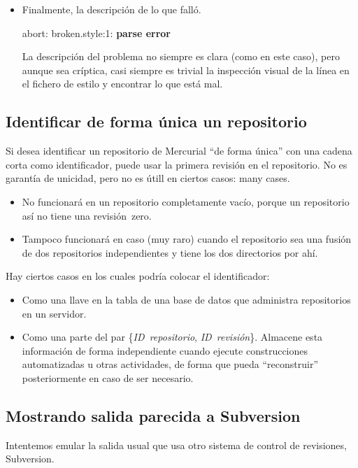 {{\begin{itemize}
\item Finalmente, la descripción de lo que falló.
  \begin{codesample4}
    abort: broken.style:1: \textbf{parse error}
  \end{codesample4}
  La descripción del problema no siempre es clara (como en este caso),
  pero aunque sea críptica, casi siempre es trivial la inspección
  visual de la línea en el fichero de estilo y encontrar lo que está
  mal.
\end{itemize}

\subsection{Identificar de forma única un repositorio}

Si desea identificar un repositorio de Mercurial ``de forma única''
con una cadena corta como identificador, puede usar la primera
revisión en el repositorio.
No es garantía de unicidad, pero no es útill en ciertos casos:
many cases.
\begin{itemize}
\item No funcionará en un repositorio completamente vacío, porque un
  repositorio así no tiene una revisión~zero.
\item Tampoco funcionará en caso (muy raro) cuando el repositorio sea
  una fusión de dos repositorios independientes y tiene los dos
  directorios por ahí.
\end{itemize}
Hay ciertos casos en los cuales podría colocar el identificador:
\begin{itemize}
\item Como una llave en la tabla de una base de datos que administra
  repositorios en un servidor.
\item Como una parte del par \{\emph{ID~repositorio}, \emph{ID~revisión}\}.
  Almacene esta información de forma independiente cuando ejecute
  construcciones automatizadas u otras actividades, de forma que pueda
  ``reconstruir'' posteriormente en caso de ser necesario.
\end{itemize}

\subsection{Mostrando salida parecida a Subversion}

Intentemos emular la salida usual que usa otro sistema de control de
revisiones,  Subversion.

}}
